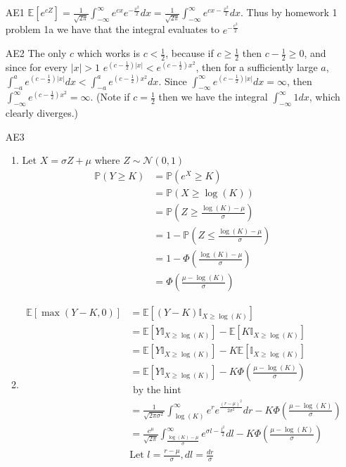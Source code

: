 \documentclass[12pt, letterpaper]{article}
\newcommand{\Pro}{\mathbb{P}}
\newcommand{\E}{\mathbb{E}}
\begin{document}
\begin{enumerate}
	\item[AE1] $\E [e^{cZ}] = \frac{1}{\sqrt{2 \pi}} \int_{-\infty}^\infty e^{cx} e^{-\frac{x^2}{2}}dx = 
	\frac{1}{\sqrt{2\pi}} \int_{-\infty}^\infty e^{cx-\frac{x^2}{2}}dx $.  
	Thus by homework 1 problem 1a we have that the integral evaluates to $e^{-\frac{c^2}{2}}$
	\item[AE2] The only $c$ which works is $c < \frac{1}{2}$, because if $c \geq \frac{1}{2}$ then
	$c - \frac{1}{2} \geq 0$, and since for every $|x| > 1$ $e^{(c - \frac{1}{2})|x|} < e^{(c - \frac{1}{2})x^2}$, then for a sufficiently large $a$, 
	$\int_{-a}^a e^{(c - \frac{1}{2})|x|}dx < \int_{-a}^a e^{(c - \frac{1}{2})x^2}dx$.
	Since $\int_{-\infty}^\infty e^{(c - \frac{1}{2})|x|} dx = \infty$, then $\int_{-\infty}^\infty e^{(c-\frac{1}{2})x^2} = \infty$.   (Note if $c=\frac{1}{2}$ then we have the integral 
	$\int_{-\infty}^\infty 1 dx$, which clearly diverges.)
	\item[AE3]
	\begin{enumerate}
		\item Let $X = \sigma Z + \mu$ where $Z \sim \mathcal{N}(0,1)$
		\begin{align*}
			\Pro(Y \geq K) &= \Pro(e^X \geq K)\\
			&= \Pro(X \geq \log(K))\\
			&= \Pro(Z \geq \frac{\log(K)-\mu}{\sigma})\\
			&= 1 - \Pro(Z \leq \frac{\log(K)-\mu}{\sigma})\\
			&= 1 - \Phi(\frac{\log(K)-\mu}{\sigma})\\
			&= \Phi(\frac{\mu - \log(K)}{\sigma})
		\end{align*}
		\item 
		\begin{align*}
		\E[\max (Y-K,0)] &= \E[(Y-K) \mathbb{I}_{X \geq \log(K)}]	\\
		&= \E[Y\mathbb{I}_{X \geq \log(K)}] - \E[K\mathbb{I}_{X \geq \log(K)}]\\
		&= \E[Y\mathbb{I}_{X \geq \log(K)}] - K\E[\mathbb{I}_{X \geq \log(K)}]\\	
		&= \E[Y\mathbb{I}_{X \geq \log(K)}] - K\Phi(\frac{\mu - \log(K)}{\sigma})\\ & \text{ by the hint}\\
		&= \frac{1}{\sqrt{2 \pi \sigma^2}} \int_{\log(K)}^\infty e^r e^{\frac{(r-\mu)^2}{2 \sigma^2}}dr - K\Phi(\frac{\mu - \log(K)}{\sigma})\\
		&= \frac{e^\mu}{\sqrt{2 \pi}} \int_{\frac{\log(K) - \mu}{\sigma}}^\infty e^{\sigma l - \frac{l^2}{2}} dl - K\Phi(\frac{\mu - \log(K)}{\sigma})\\ & \text{Let } l = \frac{r-\mu}{\sigma}, dl = \frac{dr}{\sigma}\\

\end{align*}
\end{enumerate}
\end{enumerate}
\end{document}
